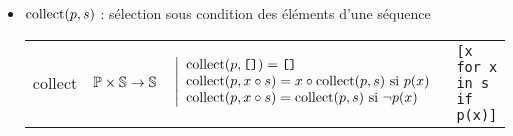\begin{itemize}
\item ${\rm collect}(p,s)$ : sélection sous condition des éléments d'une séquence\\
{\begin{tabular}{p{1cm}@{ : }p{2cm}@{ , }p{6.75cm}p{4.5cm}}
collect & $\Bbb P \times \Bbb S \rightarrow \Bbb S$	& $\displaystyle\left|\begin{array}{l}{\rm collect}(p,\mbox{\tt []}) = \mbox{\tt []}\\ 
							                                      {\rm collect}(p,x\circ s) = x\circ {\rm collect}(p,s) \mbox{ si } p(x)\\
											      {\rm collect}(p,x\circ s) = {\rm collect}(p,s) \mbox{ si } \neg p(x)\end{array}\right.$ & 
											      \color{blue}\tt [x for x in s if p(x)]
\end{tabular}}
\end{itemize}


